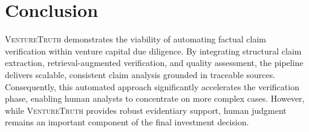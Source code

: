 \section{Conclusion} \textsc{VentureTruth} demonstrates the viability of automating factual claim verification within venture capital due diligence. By integrating structural claim extraction, retrieval-augmented verification, and quality assessment, the pipeline delivers scalable, consistent claim analysis grounded in traceable sources. Consequently, this automated approach significantly accelerates the verification phase, enabling human analysts to concentrate on more complex cases. However, while \textsc{VentureTruth} provides robust evidentiary support, human judgment remains an important component of the final investment decision.